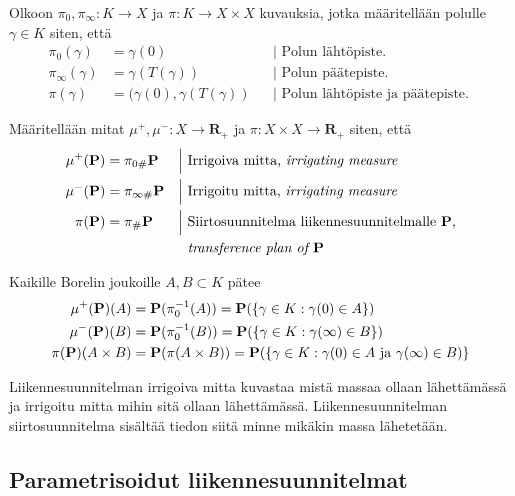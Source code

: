 \begin{definition}
    Olkoon $\pi_0, \pi_\infty: K\to X$ ja $\pi:K\to X \times X$ kuvauksia, jotka määritellään polulle $\gamma \in K$ siten, että 
    \begin{align*}
        \pi_0(\gamma) &= \gamma(0) &&\Big| \text{ Polun lähtöpiste. }\\
        \pi_\infty(\gamma) &= \gamma(T(\gamma)) &&\Big| \text{ Polun päätepiste. }\\
        \pi(\gamma) &= (\gamma(0), \gamma(T(\gamma)) &&\Big| \text{ Polun lähtöpiste ja päätepiste. }
    \end{align*}
\end{definition}

\begin{definition}
    Määritellään mitat $\mu^+, \mu^- : X \to \mathbf{R}_+$ ja $\pi: X\times X \to \mathbf{R}_+$ siten, että
    \begin{align*}
        \mu^+(\P) &= \pi_{0\#} \P  &&\Big| \text{ Irrigoiva mitta, \textit{irrigating measure} }\\
        \mu^-(\P) &= \pi_{\infty \#} \P  &&\Big| \text{ Irrigoitu mitta, \textit{irrigating measure} }\\
        \pi(\P) &= \pi_\# \P  &&\Big| \text{ Siirtosuunnitelma liikennesuunnitelmalle $\P$,}\\ 
        & &&\hphantom{\Big|} \text{ \textit{transference plan of $\P$}}
    \end{align*}
\end{definition}

\begin{remark}
    Kaikille Borelin joukoille $A, B \subset K$ pätee
    \begin{align*}
        \mu^+(\P)(A) &= \P(\pi_0^{-1}(A)) = \P(\{\gamma \in K : \gamma(0) \in A\}) \\
        \mu^-(\P)(B) &= \P(\pi_0^{-1}(B)) = \P(\{\gamma \in K : \gamma(\infty) \in B\}) \\
        \pi(\P)(A\times B) &= \P(\pi(A\times B)) = \P(\{\gamma \in K: \gamma(0) \in A\text{ ja } \gamma(\infty) \in B)\}
    \end{align*}
\end{remark}

Liikennesuunnitelman irrigoiva mitta kuvastaa mistä massaa ollaan lähettämässä ja irrigoitu mitta mihin sitä ollaan lähettämässä. Liikennesuunnitelman siirtosuunnitelma sisältää tiedon siitä minne mikäkin massa lähetetään.

\subsection{Parametrisoidut liikennesuunnitelmat}
 
